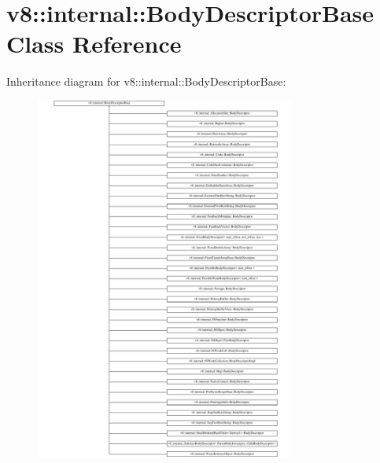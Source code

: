 \hypertarget{classv8_1_1internal_1_1BodyDescriptorBase}{}\section{v8\+:\+:internal\+:\+:Body\+Descriptor\+Base Class Reference}
\label{classv8_1_1internal_1_1BodyDescriptorBase}
Inheritance diagram for v8\+:\+:internal\+:\+:Body\+Descriptor\+Base\+:\begin{figure}[H]
\begin{center}
\leavevmode
\includegraphics[height=12.000000cm]{classv8_1_1internal_1_1BodyDescriptorBase}
\end{center}
\end{figure}
